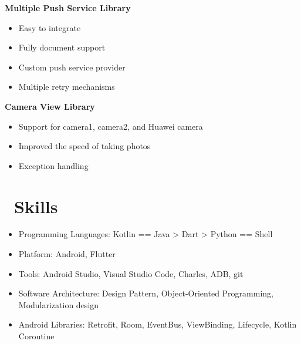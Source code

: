 \documentclass{resume}
\begin{document}
\textbf{Multiple Push Service Library}
\begin{itemize}
  \item Easy to integrate
  \item Fully document support
  \item Custom push service provider
  \item Multiple retry mechanisms
\end{itemize}

\textbf{Camera View Library}
\begin{itemize}
  \item Support for camera1, camera2, and Huawei camera
  \item Improved the speed of taking photos
  \item Exception handling
\end{itemize}


\section{\faCogs\ Skills}
\begin{itemize}[parsep=0.5ex]
  \item Programming Languages: Kotlin == Java > Dart > Python == Shell
  \item Platform: Android, Flutter
  \item Tools: Android Studio, Visual Studio Code, Charles, ADB, git
  \item Software Architecture: Design Pattern, Object-Oriented Programming, Modularization design
  \item Android Libraries: Retrofit, Room, EventBus, ViewBinding, Lifecycle, Kotlin Coroutine
\end{itemize}



%
%
\end{document}
